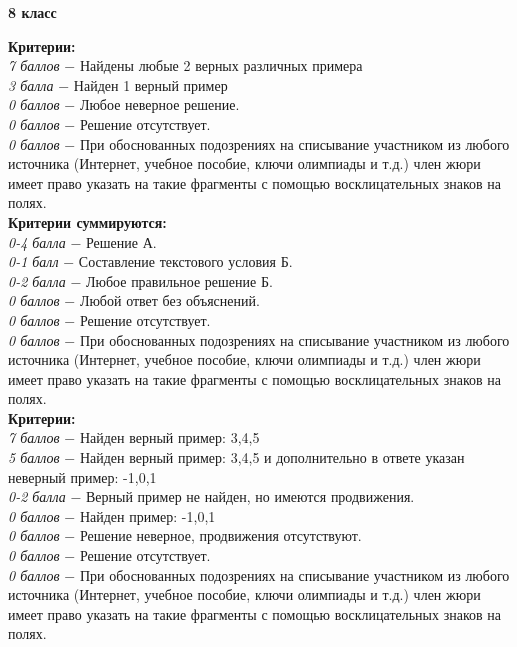 \centerline{\bf \Huge 8 класс}

 \textbf{Критерии:} \\
\textit{7 баллов} $-$ Найдены любые 2 верных различных примера\\
\textit{3 балла} $-$ Найден 1 верный пример\\
\textit{0 баллов} $-$ Любое неверное решение.\\
\textit{0 баллов} $-$ Решение отсутствует.\\
\textit{0 баллов} $-$ При обоснованных подозрениях на списывание участником из любого источника (Интернет, учебное пособие, ключи олимпиады и т.д.) член жюри имеет право указать на такие фрагменты с помощью восклицательных знаков на полях. \\

 \textbf{Критерии суммируются:} \\
\textit{0-4 балла} $-$ Решение А.\\
\textit{0-1 балл} $-$ Составление текстового условия Б.\\
\textit{0-2 балла} $-$ Любое правильное решение Б.\\
\textit{0 баллов} $-$ Любой ответ без объяснений.\\
\textit{0 баллов} $-$ Решение отсутствует.\\
\textit{0 баллов} $-$ При обоснованных подозрениях на списывание участником из любого источника (Интернет, учебное пособие, ключи олимпиады и т.д.) член жюри имеет право указать на такие фрагменты с помощью восклицательных знаков на полях. \\


 \textbf{Критерии:} \\
\textit{7 баллов} $-$ Найден верный пример: 3,4,5\\
\textit{5 баллов} $-$ Найден верный пример: 3,4,5 и дополнительно в ответе указан неверный пример: -1,0,1\\
\textit{0-2 балла} $-$ Верный пример не найден, но имеются продвижения.\\
\textit{0 баллов} $-$ Найден пример: -1,0,1\\
\textit{0 баллов} $-$ Решение неверное, продвижения отсутствуют.\\
\textit{0 баллов} $-$ Решение отсутствует.\\
\textit{0 баллов} $-$ При обоснованных подозрениях на списывание участником из любого источника (Интернет, учебное пособие, ключи олимпиады и т.д.) член жюри имеет право указать на такие фрагменты с помощью восклицательных знаков на полях. \\


